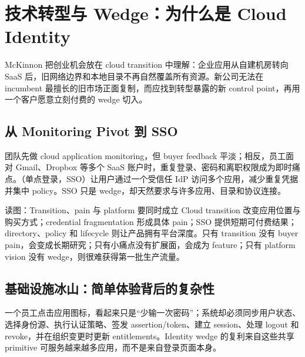 \section{技术转型与 Wedge：为什么是 Cloud Identity}

McKinnon 把创业机会放在 cloud transition 中理解：企业应用从自建机房转向 SaaS 后，旧网络边界和本地目录不再自然覆盖所有资源。新公司无法在 incumbent 最擅长的旧市场正面复制，而应找到转型暴露的新 control point，再用一个客户愿意立刻付费的 wedge 切入。

\subsection{从 Monitoring Pivot 到 SSO}

团队先做 cloud application monitoring，但 buyer feedback 平淡；相反，员工面对 Gmail、Dropbox 等多个 SaaS 账户时，重复登录、密码和离职权限成为即时痛点。（单点登录，SSO）让用户通过一个受信任 IdP 访问多个应用，减少重复凭据并集中 policy。SSO 只是 wedge，却天然要求与许多应用、目录和协议连接。


\begin{knowledgebox}{读图：Transition、pain 与 platform 要同时成立}
Cloud transition 改变应用位置与购买方式；credential fragmentation 形成具体 pain；SSO 提供短期可付费结果；directory、policy 和 lifecycle 则让产品拥有平台深度。只有 transition 没有 buyer pain，会变成长期研究；只有小痛点没有扩展面，会成为 feature；只有 platform vision 没有 wedge，则很难获得第一批生产流量。
\end{knowledgebox}


\subsection{基础设施冰山：简单体验背后的复杂性}

一个员工点击应用图标，看起来只是“少输一次密码”；系统却必须同步用户状态、选择身份源、执行认证策略、签发 assertion/token、建立 session、处理 logout 和 revoke，并在组织变更时更新 entitlements。Identity wedge 的复利来自这些共享 primitive 可服务越来越多应用，而不是来自登录页面本身。

